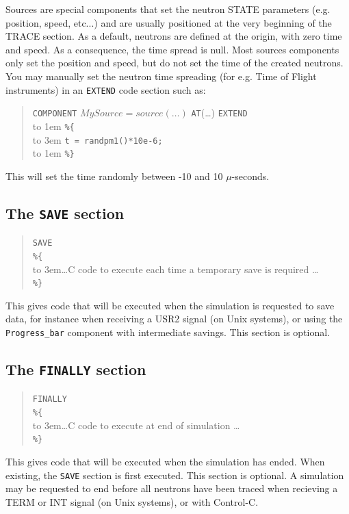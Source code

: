 Sources are special components that set the neutron STATE parameters
(e.g. position, speed, etc...) and are usually positioned at the very beginning of the
TRACE section. As a default, neutrons are defined at the origin, with zero time and speed. As a consequence, the time spread is null. Most sources components only set the position and speed, but do not set the time of the created neutrons. You may manually set the neutron time spreading (for e.g. Time of Flight instruments) in an \verb+EXTEND+ code section such as:
\begin{quote}
  \texttt{COMPONENT} $\textit{MySource} = \textit{source}(\ldots)$ \texttt{AT}(\ldots) \texttt{EXTEND} \\
  \hbox to 1em{} \verb|%{| \\
  \hbox to 3em{} \verb+t = randpm1()*10e-6;+ \\
  \hbox to 1em{} \verb|%}|
\end{quote}
This will set the time randomly between -10 and 10 $\mu$-seconds.

\subsection{The \texttt{SAVE} section}
\label{s:save}

\begin{quote}
  \texttt{SAVE} \\
  \verb|%{| \\
  \hbox to 3em{}\ldots C code to execute each time a temporary save is required \ldots \\
  \verb|%}|
\end{quote} 
This gives code that will be executed when the simulation is requested to save data, for instance when receiving a USR2 signal (on Unix systems), or using the \verb+Progress_bar+ component with intermediate savings. This section is optional.

\subsection{The \texttt{FINALLY} section}
\label{s:finally}

\begin{quote}
  \texttt{FINALLY} \\
  \verb|%{| \\
  \hbox to 3em{}\ldots C code to execute at end of simulation \ldots \\
  \verb|%}|
\end{quote}
This gives code that will be executed when the simulation has
ended. When existing, the \texttt{SAVE} section is first executed. This section is optional.
A simulation may be requested to end before all neutrons have been traced when recieving a TERM or INT signal (on Unix systems), or with Control-C.
 


